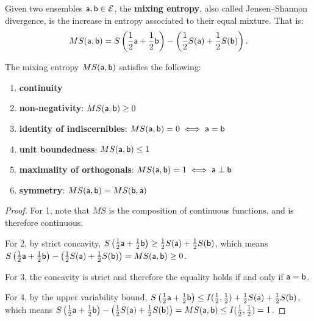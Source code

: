 \begin{mathSection}
\begin{defn}
	Given two ensembles $\ens[a], \ens[b] \in \Ens$, the \textbf{mixing entropy}, also called Jensen--Shannon divergence, is the increase in entropy associated to their equal mixture. That is:
	$$MS(\ens[a], \ens[b]) = S\left(\frac{1}{2}\ens[a] + \frac{1}{2} \ens[b]\right) - \left(\frac{1}{2} S(\ens[a]) + \frac{1}{2} S(\ens[b])\right).$$
\end{defn}

\begin{prop}
	The mixing entropy $MS(\ens[a], \ens[b])$ satisfies the following:
	\begin{enumerate}
		\item \textbf{continuity}
		\item \textbf{non-negativity}: $MS(\ens[a], \ens[b]) \geq 0$
		\item \textbf{identity of indiscernibles}: $MS(\ens[a], \ens[b]) = 0 \iff \ens[a]=\ens[b]$
		\item \textbf{unit boundedness}: $MS(\ens[a], \ens[b]) \leq 1$
		\item \textbf{maximality of orthogonals}: $MS(\ens[a], \ens[b]) = 1 \iff \ens[a] \ortho \ens[b]$
		\item \textbf{symmetry}: $MS(\ens[a], \ens[b]) = MS(\ens[b], \ens[a])$
	\end{enumerate}
\end{prop}

\begin{proof}
	For 1, note that $MS$ is the composition of continuous functions, and is therefore continuous.
	
	For 2, by strict concavity, $S\left(\frac{1}{2} \ens[a] + \frac{1}{2} \ens[b]\right) \geq \frac{1}{2} S(\ens[a]) + \frac{1}{2} S(\ens[b])$, which means $S\left(\frac{1}{2} \ens[a] + \frac{1}{2} \ens[b]\right) - \left(\frac{1}{2} S(\ens[a]) + \frac{1}{2} S(\ens[b])\right) = MS(\ens[a], \ens[b]) \geq 0$.
	
	For 3, the concavity is strict and therefore the equality holds if and only if $\ens[a] = \ens[b]$.
	
	For 4, by the upper variability bound, $S\left(\frac{1}{2} \ens[a] + \frac{1}{2} \ens[b]\right) \leq I(\frac{1}{2}, \frac{1}{2}) + \frac{1}{2} S(\ens[a]) + \frac{1}{2} S(\ens[b])$, which means $S\left(\frac{1}{2} \ens[a] + \frac{1}{2} \ens[b]\right) - \left(\frac{1}{2} S(\ens[a]) + \frac{1}{2} S(\ens[b])\right) = MS(\ens[a], \ens[b]) \leq I(\frac{1}{2}, \frac{1}{2}) = 1$.
	

\end{proof}
\end{mathSection}
